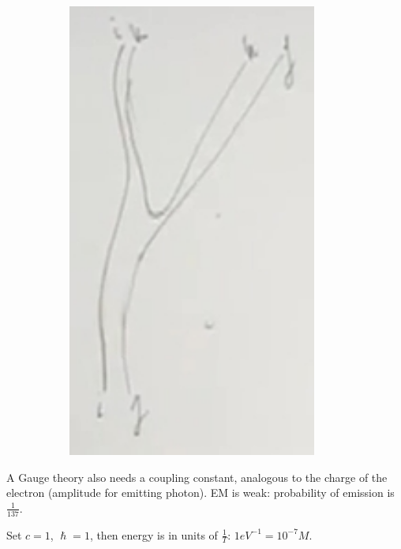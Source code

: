 \documentclass[]{article}
\begin{document}
\begin{figure}[H]
\begin{subfigure}{0.45\textwidth}
		\includegraphics[width=0.9\textwidth]{2-5-gluon-gluon.jpg}
	\end{subfigure}
\end{figure}

A Gauge theory also needs a coupling constant, analogous to the charge of the electron (amplitude for emitting photon). EM is weak: probability of emission is $\frac{1}{137}$.

Set $c=1$, $\hslash=1$, then energy is in units of $\frac{1}{T}$: $1eV^{-1}=10^{-7}M$.

\begin{table}[H]
	\begin{center}
		\begin{tabular}{|c|
				content...
			\end{tabular}
		\end{center}
	\end{table}
\end{document}

